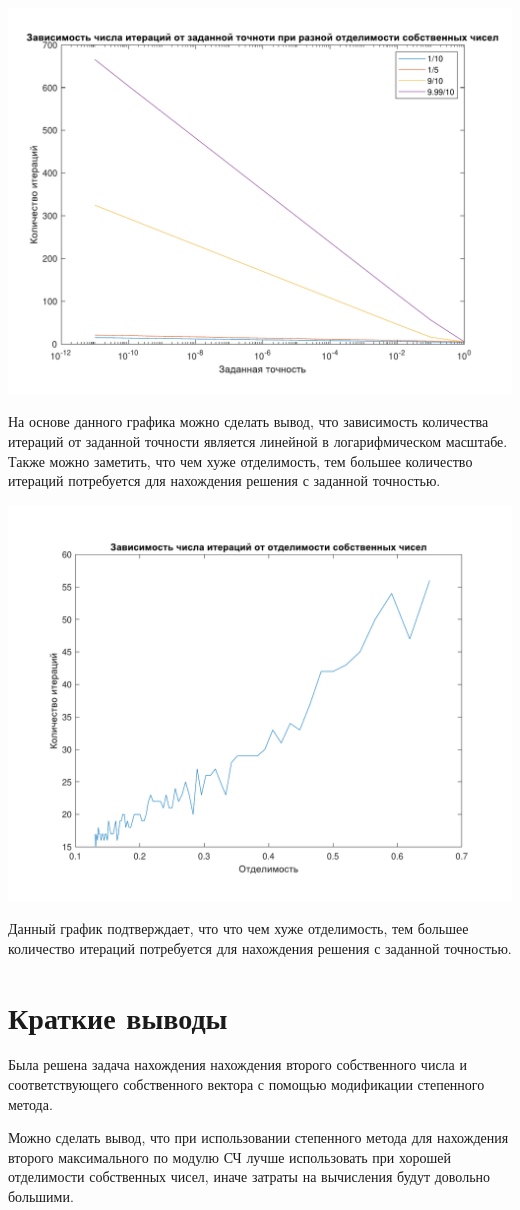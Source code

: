 \includegraphics[scale=0.75]{1.pdf}

На основе данного графика можно сделать вывод, что зависимость количества итераций от заданной точности является линейной в логарифмическом масштабе. Также можно заметить, что чем хуже отделимость, тем большее количество итераций потребуется для нахождения решения с заданной точностью.

\includegraphics[scale=0.75]{3.pdf}

Данный график подтверждает, что что чем хуже отделимость, тем большее количество итераций потребуется для нахождения решения с заданной точностью. 

\section{Краткие выводы}

Была решена задача нахождения нахождения второго собственного числа и соответствующего собственного вектора с помощью модификации степенного метода. 

Можно сделать вывод, что при использовании степенного метода для нахождения второго максимального по модулю СЧ лучше использовать при хорошей отделимости собственных чисел, иначе затраты на вычисления будут довольно большими.


